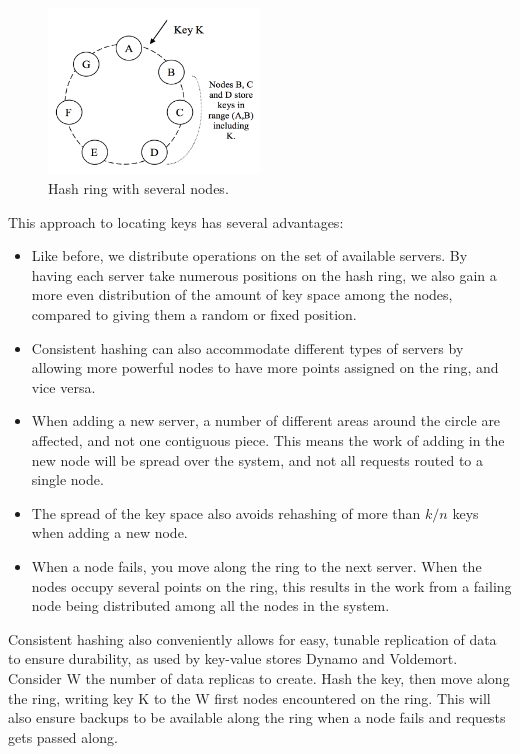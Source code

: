 \begin{figure}[h]
    \centering
    \includegraphics[width=0.5\textwidth]{introduction/hashring}
    \caption{Hash ring with several nodes\cite{dynamo}.}
    \label{fig:hashring}
\end{figure}

This approach to locating keys has several advantages:

\begin{itemize}
\item Like before, we distribute operations on the set of available servers. By having each server take numerous positions on the hash ring, we also gain a more even distribution of the amount of key space among the nodes, compared to giving them a random or fixed position.

\item Consistent hashing can also accommodate different types of servers by allowing more powerful nodes to have more points assigned on the ring, and vice versa. 

\item When adding a new server, a number of different areas around the circle are affected, and not one contiguous piece. This means the work of adding in the new node will be spread over the system, and not all requests routed to a single node.

\item The spread of the key space also avoids rehashing of more than $k/n$ keys when adding a new node. 

\item When a node fails, you move along the ring to the next server. When the nodes occupy several points on the ring, this results in the work from a failing node being distributed among all the nodes in the system.
\end{itemize}

Consistent hashing also conveniently allows for easy, tunable replication of data to ensure durability, as used by key-value stores Dynamo\cite{dynamo} and Voldemort\cite{voldemort}. Consider W the number of data replicas to create. Hash the key, then move along the ring, writing key K to the W first nodes encountered on the ring. This will also ensure backups to be available along the ring when a node fails and requests gets passed along.


